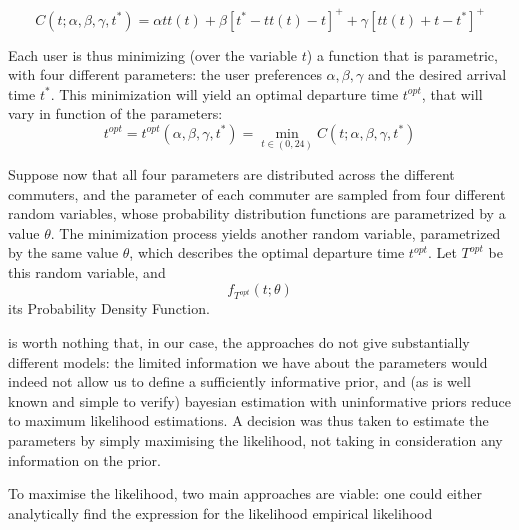 \begin{equation}
  \label{eq:cost_inf}
  C(t; \alpha, \beta, \gamma, t^*) = \alpha tt(t) + \beta[t^* - tt(t) - t]^+ + \gamma[tt(t) + t - t^*]^+
\end{equation}

Each user is thus minimizing (over the variable \(t\))
a function that is parametric, with four different parameters:
the user preferences \(\alpha, \beta, \gamma\) and the desired arrival time \(t^*\).
This minimization will yield an optimal departure time \(t^{opt}\),
that will vary in function of the parameters:
\begin{equation}
  \label{eq:t_opt}
  t^{opt} = t^{opt}(\alpha, \beta, \gamma, t^*) = \min_{t \in (0, 24)} C(t; \alpha, \beta, \gamma, t^*)
\end{equation}

Suppose now that all four parameters are distributed across the different commuters,
and the parameter of each commuter are sampled from four different random variables,
whose probability distribution functions are parametrized by a value \(\theta\).
The minimization process yields another random variable, parametrized by the same value \(\theta\),
which describes the optimal departure time \(t^{opt}\).
Let \(T^{opt}\) be this random variable, and
\[ f_{T^{opt}}(t; \theta) \]
its Probability Density Function.



 is worth nothing that, in our case, the approaches do not give substantially different models:
the limited information we have about the parameters would indeed not allow us to define a sufficiently informative prior,
and (as is well known and simple to verify) bayesian estimation with uninformative priors reduce to maximum likelihood estimations.
A decision was thus taken to estimate the parameters by simply maximising the likelihood,
not taking in consideration any information on the prior.

To maximise the likelihood, two main approaches are viable:
one could either analytically find the expression for the likelihood
empirical likelihood \parencite{10.1093/biomet/75.2.237}

